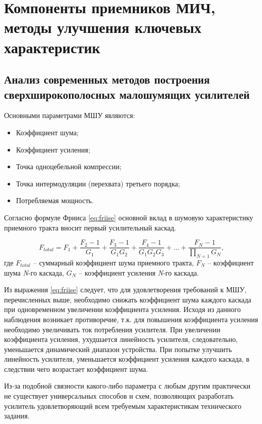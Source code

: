 \chapter{Компоненты приемников МИЧ, методы улучшения ключевых характеристик}

\section{Анализ современных методов построения сверхширокополосных малошумящих усилителей}

Основными параметрами МШУ являются:
\begin{itemize}
	\item Коэффициент шума;
	\item Коэффициент усиления;
	\item Точка одноцебельной компрессии;
	\item Точка интермодуляции (перехвата) третьего порядка;
	\item Потребляемая мощность.
\end{itemize}

Согласно формуле Фрииса \eqref{eq:friise} основной вклад в шумовую характеристику приемного тракта вносит первый усилительный каскад.

\begin{equation}
F_{total} = F_1 + \frac{{F_2 - 1}}{G_1} + \frac{{F_3 - 1}}{G_1 G_2} + \frac{F_4 - 1}{G_1 G_2 G_3} + ... + \frac{F_N - 1}{\prod\limits_{N=1} G_N},
\label{eq:friise}
\end{equation}
где \(F_{total}\) -- суммарный коэффициент шума приемного тракта, \(F_N\) -- коэффициент шума \textit{N}-го каскада, \(G_N\) -- коэффициент усиления \textit{N}-го каскада.

Из выражения \eqref{eq:friise} следует, что для удовлетворения требований к МШУ, перечисленных выше, необходимо снижать коэффициент шума каждого каскада при одновременном увеличении коэффициента усиления. Исходя из данного наблюдения возникает противоречие, т.к. для повышения коэффициента усиления необходимо увеличивать ток потребления усилителя. При увеличении коэффициента усиления, ухудшается линейность усилителя, следовательно, уменьшается динамический диапазон устройства. При попытке улучшить линейность усилителя, уменьшается коэффициент усиления каждого каскада, в следствии чего возрастает коэффициент шума.

Из-за подобной связности какого-либо параметра с любым другим практически не существует универсальных способов и схем, позволяющих разработать усилитель удовлетворяющий всем требуемым характеристикам технического задания.

